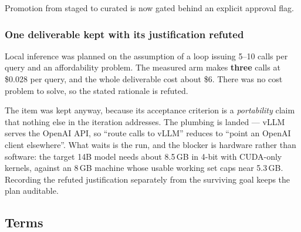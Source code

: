 Promotion from staged to curated is now gated behind an explicit approval
flag.

\subsubsection*{One deliverable kept with its justification refuted}

Local inference was planned on the assumption of a loop issuing 5--10 calls
per query and an affordability problem. The measured arm makes \textbf{three}
calls at \$0.028 per query, and the whole deliverable cost about \$6. There
was no cost problem to solve, so the stated rationale is refuted.

The item was kept anyway, because its acceptance criterion is a
\emph{portability} claim that nothing else in the iteration addresses. The
plumbing is landed --- vLLM serves the OpenAI API, so ``route calls to vLLM''
reduces to ``point an OpenAI client elsewhere''. What waits is the run, and
the blocker is hardware rather than software: the target 14B model needs
about 8.5\,GB in 4-bit with CUDA-only kernels, against an 8\,GB machine whose
usable working set caps near 5.3\,GB. Recording the refuted justification
separately from the surviving goal keeps the plan auditable.

\subsection{Terms}

